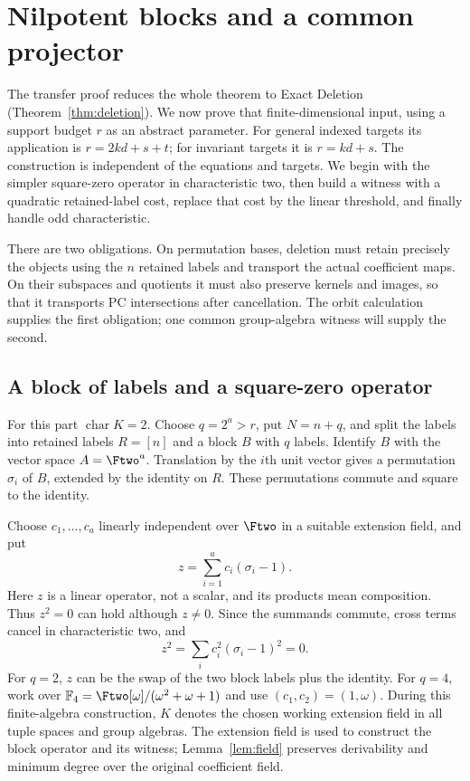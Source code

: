 \section{Nilpotent blocks and a common projector}\label{sec:block-algebra}
The transfer proof reduces the whole theorem to Exact Deletion
(Theorem~\ref{thm:deletion}). We now prove that finite-dimensional input,
using a support budget $r$ as an abstract parameter. For general indexed
targets its application is $r=2kd+s+t$; for invariant targets it is
$r=kd+s$. The construction is independent of the equations and targets.
We begin with the simpler square-zero operator in characteristic two,
then build a witness with a quadratic retained-label cost, replace that
cost by the linear threshold, and finally handle odd characteristic.

There are two obligations. On permutation bases, deletion must retain
precisely the objects using the $n$ retained labels and transport the
actual coefficient maps. On their subspaces and quotients it must also
preserve kernels and images, so that it transports PC intersections
after cancellation. The orbit calculation supplies the first
obligation; one common group-algebra witness will supply the second.

\subsection{A block of labels and a square-zero operator}\label{sec:block2}
For this part $\operatorname{char}K=2$. Choose $q=2^a>r$, put $N=n+q$, and split the labels into retained labels $R=[n]$ and a block $B$ with $q$ labels. Identify $B$ with the vector space $A=\Ftwo^a$. Translation by the $i$th unit vector gives a permutation $\sigma_i$ of $B$, extended by the identity on $R$. These permutations commute and square to the identity.

Choose $c_1,\ldots,c_a$ linearly independent over $\Ftwo$ in a suitable extension field, and put
\begin{equation}\label{eq:z2}z=\sum_{i=1}^ac_i(\sigma_i-1).\end{equation}
Here $z$ is a linear operator, not a scalar, and its products mean composition. Thus $z^2=0$ can hold although $z\ne0$. Since the summands commute, cross terms cancel in characteristic two, and
\[z^2=\sum_i c_i^2(\sigma_i-1)^2=0.\]
For $q=2$, $z$ can be the swap of the two block labels plus the identity. For $q=4$, work over $\mathbb F_4=\Ftwo[\omega]/(\omega^2+\omega+1)$ and use $(c_1,c_2)=(1,\omega)$.
During this finite-algebra construction, $K$ denotes the chosen
working extension field in all tuple spaces and group algebras.
The extension field is used to construct the block operator and its
witness; Lemma~\ref{lem:field} preserves derivability and minimum
degree over the original coefficient field.

